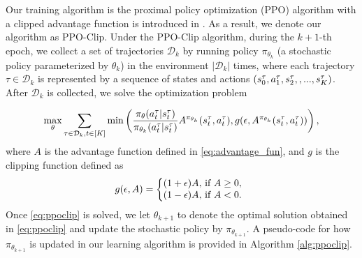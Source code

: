 \documentclass{article} %
\begin{document}
Our training algorithm is the proximal policy optimization (PPO) algorithm with a clipped advantage function is introduced in \citet{schulman2017proximal}. As a result, we denote our algorithm as PPO-Clip. Under the PPO-Clip algorithm, during the $k+1$-th epoch, we collect a set of trajectories $\mathcal{D}_k$ by running policy $\pi_{\theta_k}$ (a stochastic policy parameterized by $\theta_k$) in the environment $|\mathcal{D}_k|$ times, where each trajectory $\tau \in \mathcal{D}_k$ is represented by a sequence of states and actions $(s^\tau_0, a^\tau_1, s^\tau_2,, ..., s^\tau_{K})$. After $\mathcal{D}_k$ is collected, we solve the optimization problem

\begin{equation}\label{eq:ppoclip} \max_{\theta} \sum_{\tau \in \mathcal{D}_k, t \in [K]} \min\left(
\frac{\pi_{\theta}(a^\tau_t|s^\tau_t)}{\pi_{\theta_k}(a^\tau_t|s^\tau_t)}A^{\pi_{\theta_k}}(s^\tau_t,a^\tau_t), g(\epsilon, A^{\pi_{\theta_k}}(s^\tau_t,a^\tau_t))
\right),
\end{equation}
where $A$ is the advantage function defined in \eqref{eq:advantage_fun}, and $g$ is the clipping function defined as
\begin{align*}
g(\epsilon, A) =
\left\{
  \begin{array}{@{}ll@{}}
     (1+\epsilon)A, \, \mbox{if } A \geq 0, \\
    (1-\epsilon)A, \, \mbox{if } A < 0.
  \end{array}\right.
\end{align*}
Once \eqref{eq:ppoclip} is solved, we let $\theta_{k+1}$ to denote the optimal solution obtained in \eqref{eq:ppoclip} and update the stochastic policy by 
$\pi_{\theta_{k+1}}$. A pseudo-code for how $\pi_{\theta_{k+1}}$ is updated in our learning algorithm is provided in Algorithm \ref{alg:ppoclip}.
\end{document}

